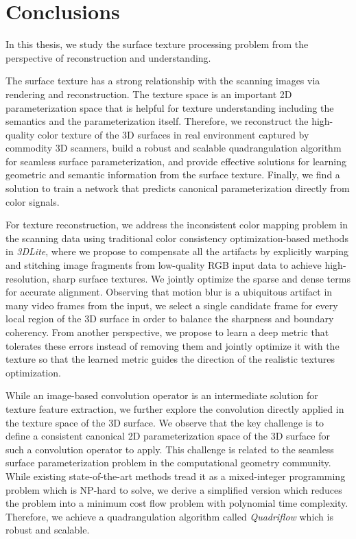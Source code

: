 \chapter{Conclusions}
\label{chapter:conclude}
In this thesis, we study the surface texture processing problem from the perspective of reconstruction and understanding.

The surface texture has a strong relationship with the scanning images via rendering and reconstruction. The texture space is an important 2D parameterization space that is helpful for texture understanding including the semantics and the parameterization itself. Therefore, we reconstruct the high-quality color texture of the 3D surfaces in real environment captured by commodity 3D scanners, build a robust and scalable quadrangulation algorithm for seamless surface parameterization, and provide effective solutions for learning geometric and semantic information from the surface texture. Finally, we find a solution to train a network that predicts canonical parameterization directly from color signals.

For texture reconstruction, we address the inconsistent color mapping problem in the scanning data using traditional color consistency optimization-based methods in \emph{3DLite}, where we propose to compensate all the artifacts by explicitly warping and stitching image fragments from low-quality RGB input data to achieve high-resolution, sharp surface textures. We jointly optimize the sparse and dense terms for accurate alignment. Observing that motion blur is a ubiquitous artifact in many video frames from the input, we select a single candidate frame for every local region of the 3D surface in order to balance the sharpness and boundary coherency.
From another perspective, we propose to learn a deep metric that tolerates these errors instead of removing them and jointly optimize it with the texture so that the learned metric guides the direction of the realistic textures optimization.

While an image-based convolution operator is an intermediate solution for texture feature extraction, we further explore the convolution directly applied in the texture space of the 3D surface.
%
We observe that the key challenge is to define a consistent canonical 2D parameterization space of the 3D surface for such a convolution operator to apply.
%
This challenge is related to the seamless surface parameterization problem in the computational geometry community. While existing state-of-the-art methods tread it as a mixed-integer programming problem which is NP-hard to solve, we derive a simplified version which reduces the problem into a minimum cost flow problem with polynomial time complexity. Therefore, we achieve a quadrangulation algorithm called \emph{Quadriflow} which is robust and scalable.

